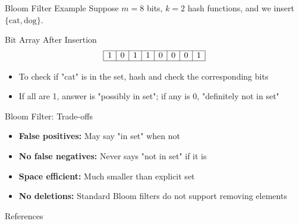 \documentclass[aspectratio=169]{beamer}
\begin{document}
\begin{frame}{Bloom Filter Example}
  Suppose $m=8$ bits, $k=2$ hash functions, and we insert $\{\text{cat}, \text{dog}\}$.
  \pause
  \begin{block}{Bit Array After Insertion}
    \[
      \begin{array}{|c|c|c|c|c|c|c|c|}
        \hline
        1 & 0 & 1 & 1 & 0 & 0 & 0 & 1 \\
        \hline
      \end{array}
    \]
  \end{block}
  \pause
  \begin{itemize}
    \item To check if "cat" is in the set, hash and check the corresponding bits
    \item If all are 1, answer is "possibly in set"; if any is 0, "definitely not in set"
  \end{itemize}
\end{frame}

\begin{frame}{Bloom Filter: Trade-offs}
  \begin{itemize}
    \item \textbf{False positives:} May say "in set" when not
          \pause
    \item \textbf{No false negatives:} Never says "not in set" if it is
          \pause
    \item \textbf{Space efficient:} Much smaller than explicit set
          \pause
    \item \textbf{No deletions:} Standard Bloom filters do not support removing elements
  \end{itemize}
\end{frame}

\begin{frame}[allowframebreaks]{References}
  \printbibliography
\end{frame}
\end{document}
